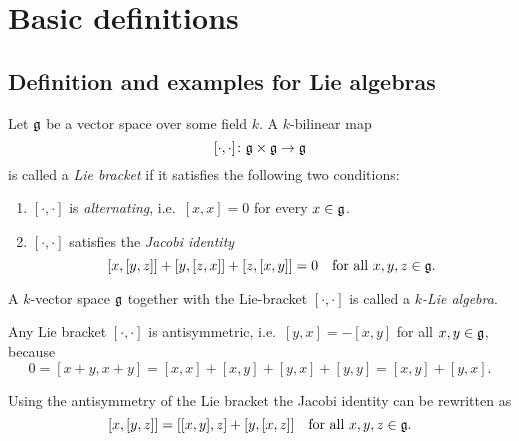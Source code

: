 \section{Basic definitions}





\subsection{Definition and examples for Lie algebras}


\begin{defi}
 Let $\mathfrak{g}$ be a vector space over some field $k$. A $k$-bilinear map
 \[
  [\cdot, \cdot] \colon \mathfrak{g} \times \mathfrak{g} \to \mathfrak{g}
 \]
 is called a \emph{Lie bracket} if it satisfies the following two conditions:
 \begin{enumerate}
  \item
   $[\cdot, \cdot]$ is \emph{alternating}, i.e.\ $[x,x] = 0$ for every $x \in \mathfrak{g}$.
  \item
   $[\cdot, \cdot]$ satisfies the \emph{Jacobi identity}
   \[
    [x,[y,z]] + [y,[z,x]] + [z,[x,y]] = 0
    \quad
    \text{for all $x,y,z \in \mathfrak{g}$}.
   \]
 \end{enumerate}
 A $k$-vector space $\mathfrak{g}$ together with the Lie-bracket $[\cdot,\cdot]$ is called a \emph{$k$-Lie algebra}.
\end{defi}


\begin{rem}
 Any Lie bracket $[\cdot, \cdot]$ is antisymmetric, i.e.\ $[y,x] = -[x,y]$ for all $x,y \in \mathfrak{g}$, because
 \[
  0 = [x+y, x+y] = [x,x] + [x,y] + [y,x] + [y,y] = [x,y] + [y,x].
 \]
\end{rem}


\begin{rem}
 Using the antisymmetry of the Lie bracket the Jacobi identity can be rewritten as
 \[
  [x,[y,z]] = [[x,y],z] + [y,[x,z]] \quad \text{for all $x,y,z \in \mathfrak{g}$}.
 \]
\end{rem}



